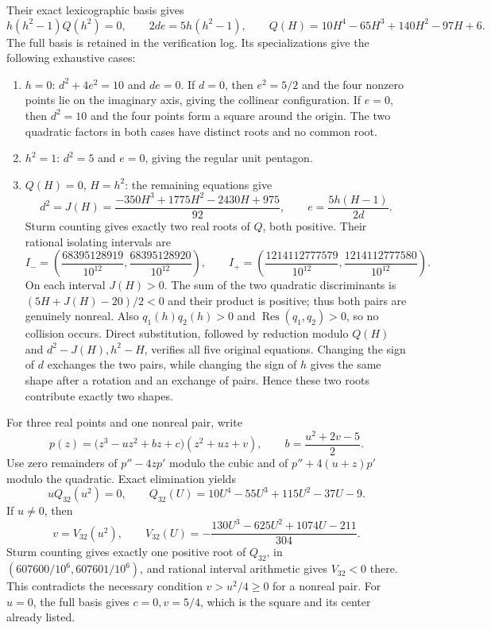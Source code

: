 \documentclass[11pt]{article}
\theoremstyle{remark}
\numberwithin{equation}{section}
\begin{document}
Their exact lexicographic basis gives
\[
 h(h^2-1)Q(h^2)=0,\qquad 2de=5h(h^2-1),\qquad
 Q(H)=10H^4-65H^3+140H^2-97H+6.
\]
The full basis is retained in the verification log. Its specializations
give the following exhaustive cases:
\begin{enumerate}
\item $h=0$: $d^2+4e^2=10$ and $de=0$. If $d=0$, then
      $e^2=5/2$ and the four nonzero points lie on the imaginary
      axis, giving the collinear configuration. If $e=0$, then
      $d^2=10$ and the four points form a square around the origin.
      The two quadratic factors in both cases have distinct roots
      and no common root.
\item $h^2=1$: $d^2=5$ and $e=0$, giving the regular unit pentagon.
\item $Q(H)=0$, $H=h^2$: the remaining equations give
\[
 d^2=J(H)=\frac{-350H^3+1775H^2-2430H+975}{92},\qquad
 e=\frac{5h(H-1)}{2d}.
\]
Sturm counting gives exactly two real roots of $Q$, both positive.
Their rational isolating intervals are
\[
 I_- =\left(\frac{68395128919}{10^{12}},
             \frac{68395128920}{10^{12}}\right),\qquad
 I_+ =\left(\frac{1214112777579}{10^{12}},
             \frac{1214112777580}{10^{12}}\right).
\]
On each interval $J(H)>0$. The sum of the two quadratic
discriminants is $(5H+J(H)-20)/2<0$ and their product is positive;
thus both pairs are genuinely nonreal. Also $q_1(h)q_2(h)>0$ and
$\operatorname{Res}(q_1,q_2)>0$, so no collision occurs. Direct
substitution, followed by reduction modulo $Q(H)$ and
$d^2-J(H),h^2-H$, verifies all five original equations.
Changing the sign of $d$ exchanges the two pairs, while changing
the sign of $h$ gives the same shape after a rotation and an exchange
of pairs. Hence these two roots contribute exactly two shapes.
\end{enumerate}

For three real points and one nonreal pair, write
\[
 p(z)=\bigl(z^3-uz^2+bz+c\bigr)(z^2+uz+v),
 \qquad b=\frac{u^2+2v-5}{2}.
\]
Use zero remainders of $p''-4zp'$ modulo the cubic and of
$p''+4(u+z)p'$ modulo the quadratic. Exact elimination yields
\[
 uQ_{32}(u^2)=0,\qquad
 Q_{32}(U)=10U^4-55U^3+115U^2-37U-9.
\]
If $u\ne0$, then
\[
 v=V_{32}(u^2),\qquad
 V_{32}(U)=-\frac{130U^3-625U^2+1074U-211}{304}.
\]
Sturm counting gives exactly one positive root of $Q_{32}$, in
$(607600/10^6,607601/10^6)$, and rational interval arithmetic gives
$V_{32}<0$ there. This contradicts the necessary condition
$v>u^2/4\ge0$ for a nonreal pair. For $u=0$, the full basis gives
$c=0,v=5/4$, which is the square and its center already listed.
\end{document}
